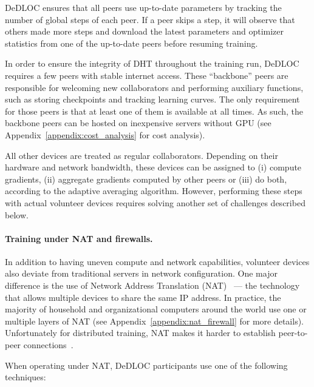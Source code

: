 DeDLOC ensures that all peers use up-to-date parameters by tracking the number of global steps of each peer. If a peer skips a step, it will observe that others made more steps and download the latest parameters and optimizer statistics from one of the up-to-date peers before resuming training. 

In order to ensure the integrity of DHT throughout the training run, DeDLOC requires a few peers with stable internet access. These ``backbone'' peers are responsible for welcoming new collaborators and performing auxiliary functions, such as storing checkpoints and tracking learning curves. The only requirement for those peers is that at least one of them is available at all times. As such, the backbone peers can be hosted on inexpensive servers without GPU (see Appendix~\ref{appendix:cost_analysis} for cost analysis).

All other devices are treated as regular collaborators. Depending on their hardware and network bandwidth, these devices can be assigned to (i) compute gradients, (ii) aggregate gradients computed by other peers or (iii) do both, according to the adaptive averaging algorithm. However, performing these steps with actual volunteer devices requires solving another set of challenges described below.

\vspace{-4pt}
\paragraph{Training under NAT and firewalls.}In addition to having uneven compute and network capabilities, volunteer devices also deviate from traditional servers in network configuration. One major difference is the use of Network Address Translation (NAT)~\cite{Biggadike05natblaster:establishing} --- the technology that allows multiple devices to share the same IP address. In practice, the majority of household and organizational computers around the world use one or multiple layers of NAT (see Appendix~\ref{appendix:nat_firewall} for more details). Unfortunately for distributed training, NAT makes it harder to establish peer-to-peer connections~\cite{hole_punching}.

When operating under NAT, DeDLOC participants use one of the following techniques:

